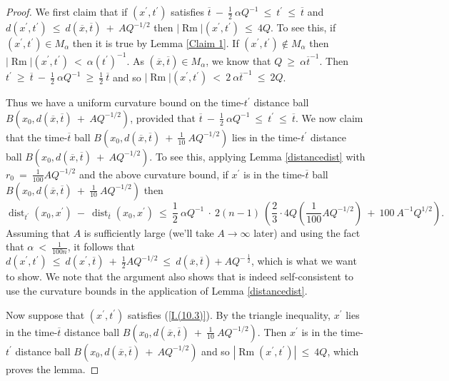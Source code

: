 \documentclass[12pt]{amsart}
\newcommand{\dist}{\operatorname{dist}}
\newcommand{\Rm}{\operatorname{Rm}}
\numberwithin{equation}{section}
\theoremstyle{plain}
\theoremstyle{definition}
\theoremstyle{remark}
\begin{document}
\begin{proof}
We first claim that if $(x^\prime, t^\prime)$ satisfies 
$\overline{t} \: - \: \frac12 \: \alpha Q^{-1} \: \le \: t^\prime \: \le \:
\overline{t}$ and $d(x^\prime, t^\prime) \: \le \: d(\overline{x}, \overline{t})
\: + \: A Q^{-1/2}$ then $|\Rm|(x^\prime, t^\prime) \: \le \: 4Q$. To see this,
if $(x^\prime, t^\prime) \in M_\alpha$ then it is true by Lemma \ref{Claim 1}.  If
$(x^\prime, t^\prime) \notin M_\alpha$ then 
$|\Rm|(x^\prime, t^\prime) \: < \: \alpha (t^\prime)^{-1}$.
As $(\overline{x}, \overline{t}) \in M_\alpha$, we know that
$Q \: \ge \: \alpha \overline{t}^{-1}$. Then $t^\prime \: \ge \:
\overline{t} \: - \: \frac12 \: \alpha Q^{-1} \: \ge \: 
\frac12 \: \overline{t}$ and so $|\Rm|(x^\prime, t^\prime) \: < \: 2 \: 
\alpha \overline{t}^{-1} \: \le \: 2Q$.

Thus we have a uniform curvature bound on the time-$t^\prime$ distance ball
$B(x_0, d(\overline{x}, \overline{t})
\: + \: A Q^{-1/2})$, provided that
$\overline{t} \: - \: \frac12 \: \alpha Q^{-1} \: \le \: t^\prime \: \le \:
\overline{t}$. We now claim that the time-$\overline{t}$ ball
$B(x_0, d(\overline{x}, \overline{t})
\: + \: \frac{1}{10} \: A Q^{-1/2})$ lies in the time-$t^\prime$ distance ball
$B(x_0, d(\overline{x}, \overline{t})
\: + \: A Q^{-1/2})$. To see this,
applying Lemma \ref{distancedist} with $r_0 \: = \:
\frac{1}{100} A Q^{-1/2}$ and the above curvature bound, if
$x^\prime$ is in the time-$\overline{t}$ ball
$B(x_0, d(\overline{x}, \overline{t})
\: + \: \frac{1}{10} \: A Q^{-1/2})$ then
\begin{equation} \label{32.4}
\dist_{t^\prime}(x_0, x^\prime) \: - \: 
\dist_{\overline{t}}(x_0, x^\prime) \: \le \:
\frac12 \: \alpha Q^{-1} \: \cdot \: 2(n-1) \:
\left( \frac23 \cdot 4Q ( \frac{1}{100} A Q^{-1/2}) \: + \:
100 \: A^{-1} Q^{1/2} \right). 
\end{equation}
Assuming that $A$ is sufficiently large
(we'll take $A \rightarrow \infty$ later)
and using the fact that $\alpha \: < \: \frac{1}{100n}$, it follows that
$d(x^\prime, t^\prime) \: \le \: 
d(x^\prime, \overline{t}) \: + \: 
\frac{1}{2} A Q^{-1/2} \: \le \: 
d(\overline{x},\overline{t}) + A Q^{- \: \frac12}$, 
which is what we want to show.  We note that
the argument also shows that is indeed self-consistent to use the curvature
bounds in the application of Lemma \ref{distancedist}.

Now suppose that  $(x^\prime, t^\prime)$ satisfies 
(\ref{I.(10.3)}). By the triangle inequality,
$x^\prime$ lies in the time-$\overline{t}$ distance ball
$B(x_0, d(\overline{x}, \overline{t}) \: + \: \frac{1}{10} \: A Q^{-1/2})$.
Then $x^\prime$ is in the time-$t^\prime$ distance ball
$B(x_0, d(\overline{x}, \overline{t})
\: + \: A Q^{-1/2})$ and so $|\Rm(x^\prime, t^\prime)| \: \le \: 4Q$,
which proves the lemma.
\end{proof}
\end{document}
